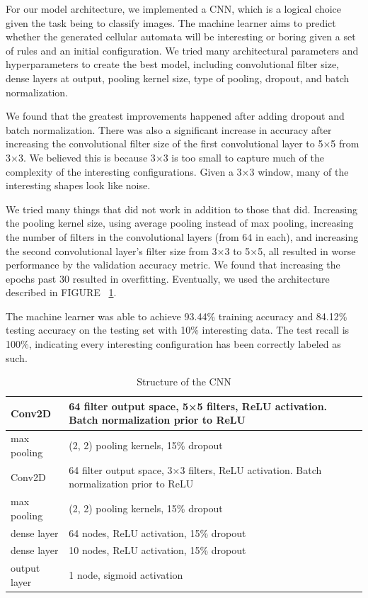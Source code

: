 \documentclass[12pt]{article}
\numberwithin{figure}{section} %
\begin{document}
For our model architecture, we implemented a CNN, which is a logical choice given the task being to classify images. The machine learner aims to predict whether the generated cellular automata will be interesting or boring given a set of rules and an initial configuration. We tried many architectural parameters and hyperparameters to create the best model, including convolutional filter size, dense layers at output, pooling kernel size, type of pooling, dropout, and batch normalization. 

We found that the greatest improvements happened after adding dropout and batch normalization. There was also a significant increase in accuracy after increasing the convolutional filter size of the first convolutional layer to 5×5 from 3×3. We believed this is because 3×3 is too small to capture much of the complexity of the interesting configurations. Given a 3×3 window, many of the interesting shapes look like noise.

We tried many things that did not work in addition to those that did. Increasing the pooling kernel size, using average pooling instead of max pooling, increasing the number of filters in the convolutional layers (from 64 in each), and increasing the second convolutional layer’s filter size from 3×3 to 5×5, all resulted in worse performance by the validation accuracy metric. We found that increasing the epochs past 30 resulted in overfitting. Eventually, we used the architecture described in FIGURE ~\ref{table:CNN structure}.

The machine learner was able to achieve 93.44\% training accuracy and 84.12\% testing accuracy on the testing set with 10\% interesting data. The test recall is 100\%, indicating every interesting configuration has been correctly labeled as such. 

\begin{table}[H]
\begin{center}
\begin{tabular}{ | m{2cm} | m{8cm} | } 
\hline
Conv2D & 64 filter output space, 5×5 filters, ReLU activation. Batch normalization prior to ReLU \\ 
\hline
max pooling & (2, 2) pooling kernels, 15\% dropout  \\ 
\hline
Conv2D & 64 filter output space, 3×3 filters, ReLU activation. Batch normalization prior to ReLU  \\ 
\hline
max pooling & (2, 2) pooling kernels, 15\% dropout \\ 
\hline
dense layer & 64 nodes, ReLU activation, 15\% dropout  \\ 
\hline
dense layer & 10 nodes, ReLU activation, 15\% dropout  \\ 
\hline
output layer & 1 node, sigmoid activation \\
\hline
\end{tabular}
\caption{Structure of the CNN}
\vspace{-1.5em}
\end{center}
\label{table:CNN structure}
\end{table}
\end{document}
